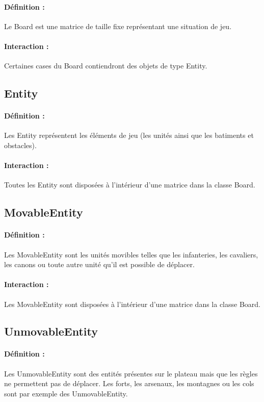 			\paragraph{Définition :}
			Le Board est une matrice de taille fixe représentant une situation de jeu.
			\paragraph{Interaction :}
			Certaines cases du Board contiendront des objets de type Entity.

		\subsection*{Entity}

			\paragraph{Définition :}
			Les Entity représentent les éléments de jeu (les unités ainsi que les batiments et obstacles).
			\paragraph{Interaction :}
			Toutes les Entity sont disposées à l'intérieur d'une matrice dans la classe Board.

		\subsection*{MovableEntity}

			\paragraph{Définition :}
			Les MovableEntity sont les unités movibles telles que les infanteries, les cavaliers, les canons ou toute autre unité 
			qu'il est possible de déplacer.
			\paragraph{Interaction :}
			Les MovableEntity sont disposées à l'intérieur d'une matrice dans la classe Board.

		\subsection*{UnmovableEntity}

			\paragraph{Définition :}
			Les UnmovableEntity sont des entités présentes sur le plateau mais que les règles ne permettent pas de déplacer. 
			Les forts, les arsenaux, les montagnes ou les cols sont par exemple des UnmovableEntity.
